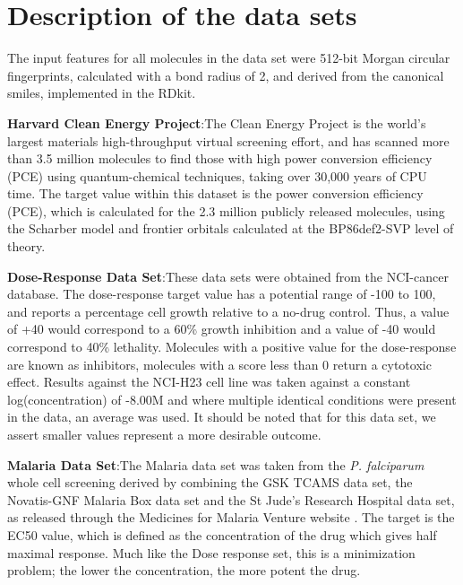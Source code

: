 \section{Description of the data sets}

The input features for all molecules in the data set were 512-bit Morgan circular fingerprints\cite{Rogers_2010}, calculated with a bond radius of 2, and derived from the canonical smiles, implemented in the RDkit\cite{rdkit}.

\textbf{Harvard Clean Energy Project}:The Clean Energy Project is the world's largest materials high-throughput virtual screening effort\cite{hachmann_lead_2014,hachmann_harvard_2011}, and has scanned more than 3.5 million molecules to find those with high power conversion efficiency (PCE) using quantum-chemical techniques, taking over 30,000 years of CPU time. The target value within this dataset is the power conversion efficiency (PCE), which is calculated for the 2.3 million publicly released molecules, using the Scharber model\cite{scharber_design_2006} and frontier orbitals calculated at the BP86\cite{perdew_density-functional_1986,becke_densityfunctional_1993}\/def2-SVP\cite{weigend_balanced_2005} level of theory.


\textbf{Dose-Response Data Set}:These data sets were obtained from the NCI-cancer database\cite{_nci_}.  The dose-response target value has a potential range of -100 to 100, and reports a percentage cell growth relative to a no-drug control.  Thus, a value of +40 would correspond to a 60\% growth inhibition and a value of -40 would correspond to 40\% lethality.  Molecules with a positive value for the dose-response are known as inhibitors, molecules with a score less than 0 return a cytotoxic effect. Results against the NCI-H23 cell line was taken against a constant log(concentration) of -8.00M and where multiple identical conditions were present in the data, an average was used.  It should be noted that for this data set, we assert smaller values represent a more desirable outcome. 


\textbf{Malaria Data Set}:The Malaria data set was taken from the \textit{P. falciparum} whole cell screening derived by combining the GSK TCAMS data set, the Novatis-GNF Malaria Box data set and the St Jude's Research Hospital data set, as released through the Medicines for Malaria Venture website \cite{23798988}.  The target is the EC50 value, which is defined as the concentration of the drug which gives half maximal response.  Much like the Dose response set, this is a minimization problem; the lower the concentration, the more potent the drug.

